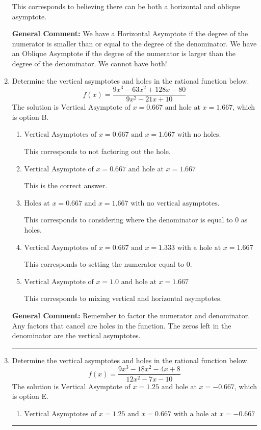 \documentclass{extbook}[14pt]
\newcommand{\litem}[1]{\item #1

\rule{\textwidth}{0.4pt}}
\begin{document}
\begin{enumerate}
{\begin{enumerate}[label=\Alph*.]
This corresponds to believing there can be both a horizontal and oblique asymptote.
\end{enumerate}

\textbf{General Comment:} We have a Horizontal Asymptote if the degree of the numerator is smaller than or equal to the degree of the denominator. We have an Oblique Asymptote if the degree of the numerator is larger than the degree of the denominator. We cannot have both!
}
\litem{
Determine the vertical asymptotes and holes in the rational function below.
\[ f(x) = \frac{9x^{3} -63 x^{2} +128 x -80}{9x^{2} -21 x + 10} \]The solution is \( \text{Vertical Asymptote of } x = 0.667 \text{ and hole at } x = 1.667 \), which is option B.\begin{enumerate}[label=\Alph*.]
\item \( \text{Vertical Asymptotes of } x = 0.667 \text{ and } x = 1.667 \text{ with no holes.} \)

This corresponds to not factoring out the hole.
\item \( \text{Vertical Asymptote of } x = 0.667 \text{ and hole at } x = 1.667 \)

This is the correct answer.
\item \( \text{Holes at } x = 0.667 \text{ and } x = 1.667 \text{ with no vertical asymptotes.} \)

This corresponds to considering where the denominator is equal to 0 as holes.
\item \( \text{Vertical Asymptotes of } x = 0.667 \text{ and } x = 1.333 \text{ with a hole at } x = 1.667 \)

This corresponds to setting the numerator equal to 0.
\item \( \text{Vertical Asymptote of } x = 1.0 \text{ and hole at } x = 1.667 \)

This corresponds to mixing vertical and horizontal asymptotes.
\end{enumerate}

\textbf{General Comment:} Remember to factor the numerator and denominator. Any factors that cancel are holes in the function. The zeros left in the denominator are the vertical asymptotes.
}
\litem{
Determine the vertical asymptotes and holes in the rational function below.
\[ f(x) = \frac{9x^{3} -18 x^{2} -4 x + 8}{12x^{2} -7 x -10} \]The solution is \( \text{Vertical Asymptote of } x = 1.25 \text{ and hole at } x = -0.667 \), which is option E.\begin{enumerate}[label=\Alph*.]
\item \( \text{Vertical Asymptotes of } x = 1.25 \text{ and } x = 0.667 \text{ with a hole at } x = -0.667 \)


\end{enumerate}}
\end{enumerate}
\end{document}
